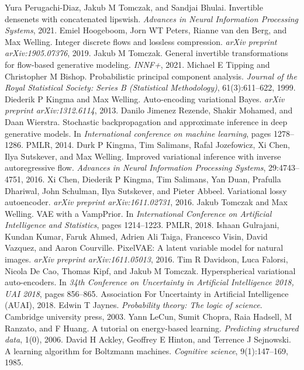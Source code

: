 \begin{chapterreferences}
 Yura Perugachi-Diaz, Jakub M Tomczak, and Sandjai Bhulai. Invertible densenets with concatenated lipswish. \emph{Advances in Neural Information Processing Systems}, 2021.
 Emiel Hoogeboom, Jorn WT Peters, Rianne van den Berg, and Max Welling. Integer discrete flows and lossless compression. \emph{arXiv preprint arXiv:1905.07376}, 2019.
 Jakub M Tomczak. General invertible transformations for flow-based generative modeling. \emph{INNF+}, 2021.
 Michael E Tipping and Christopher M Bishop. Probabilistic principal component analysis. \emph{Journal of the Royal Statistical Society: Series B (Statistical Methodology)}, 61(3):611–622, 1999.
 Diederik P Kingma and Max Welling. Auto-encoding variational Bayes. \emph{arXiv preprint arXiv:1312.6114}, 2013.
 Danilo Jimenez Rezende, Shakir Mohamed, and Daan Wierstra. Stochastic backpropagation and approximate inference in deep generative models. In \emph{International conference on machine learning}, pages 1278–1286. PMLR, 2014.
 Durk P Kingma, Tim Salimans, Rafal Jozefowicz, Xi Chen, Ilya Sutskever, and Max Welling. Improved variational inference with inverse autoregressive flow. \emph{Advances in Neural Information Processing Systems}, 29:4743–4751, 2016.
 Xi Chen, Diederik P Kingma, Tim Salimans, Yan Duan, Prafulla Dhariwal, John Schulman, Ilya Sutskever, and Pieter Abbeel. Variational lossy autoencoder. \emph{arXiv preprint arXiv:1611.02731}, 2016.
 Jakub Tomczak and Max Welling. VAE with a VampPrior. In \emph{International Conference on Artificial Intelligence and Statistics}, pages 1214–1223. PMLR, 2018.
 Ishaan Gulrajani, Kundan Kumar, Faruk Ahmed, Adrien Ali Taiga, Francesco Visin, David Vazquez, and Aaron Courville. PixelVAE: A latent variable model for natural images. \emph{arXiv preprint arXiv:1611.05013}, 2016.
 Tim R Davidson, Luca Falorsi, Nicola De Cao, Thomas Kipf, and Jakub M Tomczak. Hyperspherical variational auto-encoders. In \emph{34th Conference on Uncertainty in Artificial Intelligence 2018, UAI 2018}, pages 856–865. Association For Uncertainty in Artificial Intelligence (AUAI), 2018.
 Edwin T Jaynes. \emph{Probability theory: The logic of science}. Cambridge university press, 2003.
 Yann LeCun, Sumit Chopra, Raia Hadsell, M Ranzato, and F Huang. A tutorial on energy-based learning. \emph{Predicting structured data}, 1(0), 2006.
 David H Ackley, Geoffrey E Hinton, and Terrence J Sejnowski. A learning algorithm for Boltzmann machines. \emph{Cognitive science}, 9(1):147–169, 1985.

\end{chapterreferences}
